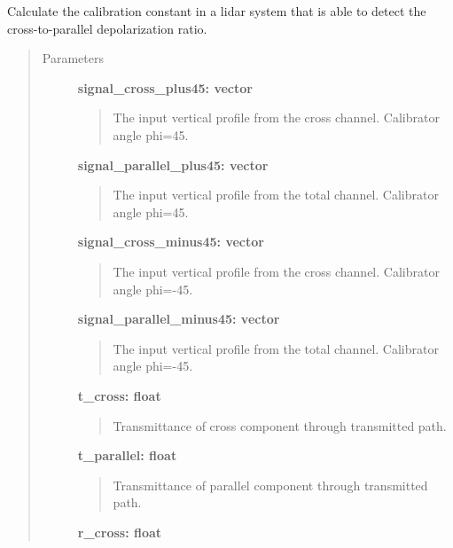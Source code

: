 \documentclass[letterpaper,10pt,english]{sphinxmanual}
\begin{document}
\begin{fulllineitems}
\label{depolarization:depolarization.calibration_constant_cross_parallel_profile}
Calculate the calibration constant in a lidar system that is able to 
detect the cross-to-parallel depolarization ratio.
\begin{quote}\begin{description}
\item[{Parameters}] \leavevmode
\textbf{signal\_cross\_plus45: vector}
\begin{quote}

The input vertical profile from the cross channel. Calibrator angle phi=45.
\end{quote}

\textbf{signal\_parallel\_plus45: vector}
\begin{quote}

The input vertical profile from the total channel. Calibrator angle phi=45.
\end{quote}

\textbf{signal\_cross\_minus45: vector}
\begin{quote}

The input vertical profile from the cross channel. Calibrator angle phi=-45.
\end{quote}

\textbf{signal\_parallel\_minus45: vector}
\begin{quote}

The input vertical profile from the total channel. Calibrator angle phi=-45.
\end{quote}

\textbf{t\_cross: float}
\begin{quote}

Transmittance of cross component through transmitted path.
\end{quote}

\textbf{t\_parallel: float}
\begin{quote}

Transmittance of parallel component through transmitted path.
\end{quote}

\textbf{r\_cross: float}
\begin{quote}


\end{quote}
\end{description}
\end{quote}
\end{fulllineitems}
\end{document}

